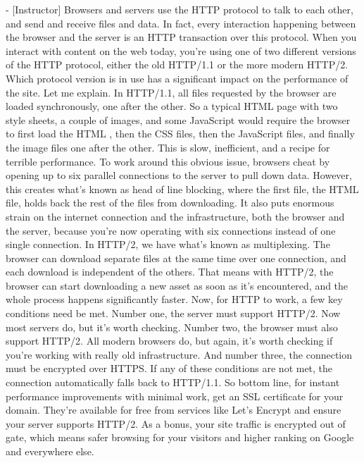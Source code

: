 - [Instructor] Browsers and servers use the HTTP protocol to talk to each other, and
send and receive files and data. In fact, every interaction happening between the 
browser and the server is an HTTP transaction over this protocol. When you interact
with content on the web today, you're using one of two different versions of the 
HTTP protocol, either the old HTTP/1.1 or the more modern HTTP/2. Which protocol 
version is in use has a significant impact on the performance of the site. Let me 
explain. In HTTP/1.1, all files requested by the browser are loaded synchronously, 
one after the other. So a typical HTML page with two style sheets, a couple of 
images, and some JavaScript would require the browser to first load the HTML 
, then the CSS files, then the JavaScript files, and finally the image files one 
after the other. This is slow, inefficient, and a recipe for terrible performance.
To work around this obvious issue, browsers cheat by opening up to six parallel 
connections to the server to pull down data. However, this creates what's known 
as head of line blocking, where the first file, the HTML file, holds back the 
rest of the files from downloading. It also puts enormous strain on the internet 
connection and the infrastructure, both the browser and the server, because 
you're now operating with six connections instead of one single connection. In
HTTP/2, we have what's known as multiplexing. The browser can download 
separate files at the same time over one connection, and each download is 
independent of the others. That means with HTTP/2, the browser can start 
downloading a new asset as soon as it's encountered, and the whole process 
happens significantly faster. Now, for HTTP to work, a few key conditions need 
be met. Number one, the server must support HTTP/2. Now most servers do, but 
it's worth checking. Number two, the browser must also support HTTP/2. All 
modern browsers do, but again, it's worth checking if you're working with 
really old infrastructure. And number three, the connection must be encrypted
over HTTPS. If any of these conditions are not met, the connection 
automatically falls back to HTTP/1.1. So bottom line, for instant performance
improvements with minimal work, get an SSL certificate for your domain. 
They're available for free from services like Let's Encrypt and ensure your 
server supports HTTP/2. As a bonus, your site traffic is encrypted out of 
gate, which means safer browsing for your visitors and higher ranking on 
Google and everywhere else.
